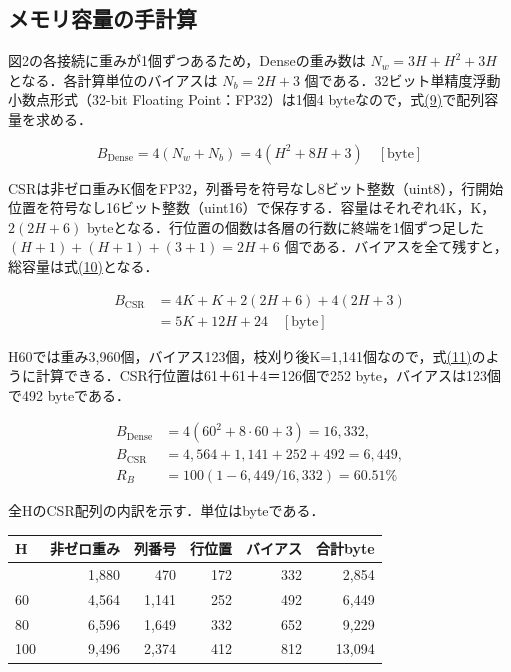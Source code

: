 \documentclass[
  10pt,
  a4paper,
]{article}
\begin{document}
\subsection{メモリ容量の手計算}\label{ux30e1ux30e2ux30eaux5bb9ux91cfux306eux624bux8a08ux7b97}

図2の各接続に重みが1個ずつあるため，Denseの重み数は \(N_w=3H+H^2+3H\)
となる．各計算単位のバイアスは \(N_b=2H+3\)
個である．32ビット単精度浮動小数点形式（32-bit Floating
Point：FP32）は1個4
byteなので，式\hyperref[eq:dense-bytes]{(9)}で配列容量を求める．

\begin{equation}\label{eq:dense-bytes}
B_{\mathrm{Dense}}=4(N_w+N_b)=4(H^2+8H+3)\quad[\mathrm{byte}]
\end{equation}

CSRは非ゼロ重みK個をFP32，列番号を符号なし8ビット整数（uint8），行開始位置を符号なし16ビット整数（uint16）で保存する．容量はそれぞれ4K，K，\(2(2H+6)\)
byteとなる．行位置の個数は各層の行数に終端を1個ずつ足した
\((H+1)+(H+1)+(3+1)=2H+6\)
個である．バイアスを全て残すと，総容量は式\hyperref[eq:csr-bytes]{(10)}となる．

\begin{equation}\label{eq:csr-bytes}
\begin{aligned}
B_{\mathrm{CSR}}&=4K+K+2(2H+6)+4(2H+3)\\
&=5K+12H+24\quad[\mathrm{byte}]
\end{aligned}
\end{equation}

H60では重み3,960個，バイアス123個，枝刈り後K=1,141個なので，式\hyperref[eq:h60-capacity]{(11)}のように計算できる．CSR行位置は61＋61＋4＝126個で252
byte，バイアスは123個で492 byteである．

\begin{equation}\label{eq:h60-capacity}
\begin{aligned}
B_{\mathrm{Dense}}&=4(60^2+8\cdot60+3)=16,332,\\
B_{\mathrm{CSR}}&=4,564+1,141+252+492=6,449,\\
R_B&=100(1-6,449/16,332)=60.51\%
\end{aligned}
\end{equation}


全HのCSR配列の内訳を示す．単位はbyteである．

\begin{longtable}[]{@{}lrrrrr@{}}
\toprule\noalign{}
H & 非ゼロ重み & 列番号 & 行位置 & バイアス & 合計byte \\
\midrule\noalign{}
\endhead
\bottomrule\noalign{}
\endlastfoot
40 & 1,880 & 470 & 172 & 332 & 2,854 \\
60 & 4,564 & 1,141 & 252 & 492 & 6,449 \\
80 & 6,596 & 1,649 & 332 & 652 & 9,229 \\
100 & 9,496 & 2,374 & 412 & 812 & 13,094 \\
\end{longtable}
\end{document}
